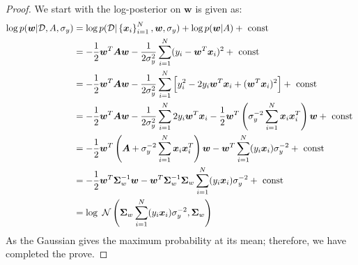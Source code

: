 \begin{proof}
    We start with the log-posterior on $\boldsymbol w$ is given as:
    \begin{equation*}
    \begin{aligned}
        \log p(\boldsymbol w | \mathcal{D}, A, \sigma_y) &= \log p(\mathcal{D}|\left\{ \boldsymbol x_i \right\}^N_{i=1}, \boldsymbol w, \sigma_y) + \log p(\boldsymbol w | A) + \text{ const } \\
        &= -\frac{1}{2}\boldsymbol w^T\boldsymbol A\boldsymbol w - \frac{1}{2\sigma^2_y}\sum^N_{i=1}(y_i-\boldsymbol w^T\boldsymbol x_i)^2 + \text{ const } \\
        &= -\frac{1}{2}\boldsymbol w^T\boldsymbol A\boldsymbol w - \frac{1}{2\sigma^2_y}\sum^N_{i=1}\Big[y_i^2-2y_i\boldsymbol w^T\boldsymbol x_i + (\boldsymbol w^T\boldsymbol x_i)^2\Big] + \text{ const } \\
        &= -\frac{1}{2}\boldsymbol w^T\boldsymbol A\boldsymbol w - \frac{1}{2\sigma^2_y}\sum^N_{i=1} 2y_i\boldsymbol w^T\boldsymbol x_i - \frac{1}{2} \boldsymbol w^T\left( \sigma^{-2}_y\sum^N_{i=1}\boldsymbol x_i\boldsymbol x_i^T \right)\boldsymbol w + \text{ const } \\
        &= -\frac{1}{2}\boldsymbol w^T\left( \boldsymbol A + \sigma^{-2}_y\sum^N_{i=1}\boldsymbol x_i\boldsymbol x_i^T \right)\boldsymbol w - \boldsymbol w^T\sum^N_{i=1} (y_i \boldsymbol x_i)\sigma^{-2}_y + \text{ const } \\
        &= -\frac{1}{2}\boldsymbol w^T\boldsymbol \Sigma^{-1}_w\boldsymbol w - \boldsymbol w^T\boldsymbol \Sigma_w^{-1}\boldsymbol \Sigma_w\sum^N_{i=1} (y_i \boldsymbol x_i)\sigma^{-2}_y + \text{ const } \\
        &= \log \ \mathcal{N}\left( \boldsymbol \Sigma_w\sum^N_{i=1} (y_i \boldsymbol x_i)\sigma^{-2}_y, \boldsymbol\Sigma_w \right)
    \end{aligned}
    \end{equation*}
    As the Gaussian gives the maximum probability at its mean; therefore, we have completed the prove. 
\end{proof}



